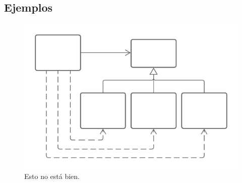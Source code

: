 \documentclass[a4paper,11pt]{article}
\begin{document}
\subsection{Ejemplos}
\begin{figure}[!h]
    \centering
    \includegraphics[scale=.7]{assets/ec1.png}
    \caption{Esto no está bien.}
\end{figure}
\end{document}
